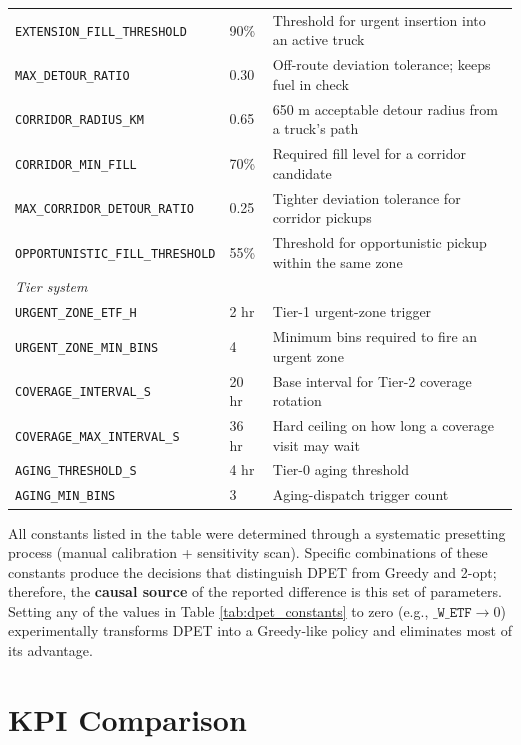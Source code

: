 \documentclass[12pt,a4paper]{report}
\begin{document}
\begin{table}[H]
\begin{tabular}{lll}
\texttt{EXTENSION\_FILL\_THRESHOLD}    & 90\% & Threshold for urgent insertion into an active truck \\
\texttt{MAX\_DETOUR\_RATIO}            & 0.30 & Off-route deviation tolerance; keeps fuel in check \\
\texttt{CORRIDOR\_RADIUS\_KM}          & 0.65 & 650 m acceptable detour radius from a truck's path \\
\texttt{CORRIDOR\_MIN\_FILL}           & 70\% & Required fill level for a corridor candidate \\
\texttt{MAX\_CORRIDOR\_DETOUR\_RATIO}  & 0.25 & Tighter deviation tolerance for corridor pickups \\
\texttt{OPPORTUNISTIC\_FILL\_THRESHOLD} & 55\% & Threshold for opportunistic pickup within the same zone \\
\midrule
\multicolumn{3}{l}{\textit{Tier system}} \\
\texttt{URGENT\_ZONE\_ETF\_H}       & 2 hr  & Tier-1 urgent-zone trigger \\
\texttt{URGENT\_ZONE\_MIN\_BINS}    & 4     & Minimum bins required to fire an urgent zone \\
\texttt{COVERAGE\_INTERVAL\_S}      & 20 hr & Base interval for Tier-2 coverage rotation \\
\texttt{COVERAGE\_MAX\_INTERVAL\_S} & 36 hr & Hard ceiling on how long a coverage visit may wait \\
\texttt{AGING\_THRESHOLD\_S}        & 4 hr  & Tier-0 aging threshold \\
\texttt{AGING\_MIN\_BINS}           & 3     & Aging-dispatch trigger count \\
\bottomrule
\end{tabular}
\end{table}


\indent All constants listed in the table were determined through a systematic presetting process (manual calibration + sensitivity scan). Specific combinations of these constants produce the decisions that distinguish DPET from Greedy and 2-opt; therefore, the \textbf{causal source} of the reported difference is this set of parameters. Setting any of the values in Table \ref{tab:dpet_constants} to zero (e.g., \(\texttt{\_W\_ETF} \rightarrow 0\)) experimentally transforms DPET into a Greedy-like policy and eliminates most of its advantage.

\section{KPI Comparison}
\label{sec:kpi_genel}
\end{document}
